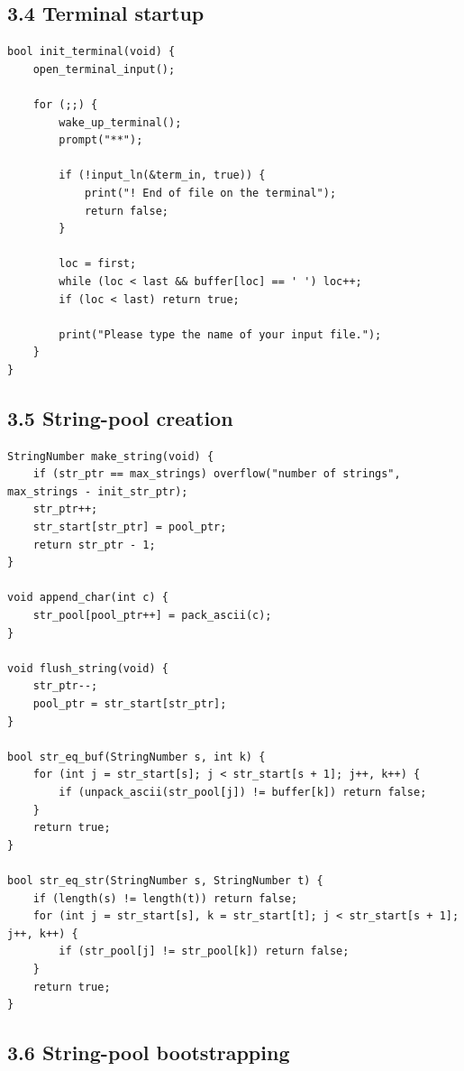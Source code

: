 \documentclass[11pt]{article}
\begin{document}
\subsection{3.4 Terminal startup}\label{terminal-startup}

\begin{verbatim}
bool init_terminal(void) {
    open_terminal_input();

    for (;;) {
        wake_up_terminal();
        prompt("**");

        if (!input_ln(&term_in, true)) {
            print("! End of file on the terminal");
            return false;
        }

        loc = first;
        while (loc < last && buffer[loc] == ' ') loc++;
        if (loc < last) return true;

        print("Please type the name of your input file.");
    }
}
\end{verbatim}

\subsection{3.5 String-pool creation}\label{string-pool-creation}

\begin{verbatim}
StringNumber make_string(void) {
    if (str_ptr == max_strings) overflow("number of strings", max_strings - init_str_ptr);
    str_ptr++;
    str_start[str_ptr] = pool_ptr;
    return str_ptr - 1;
}

void append_char(int c) {
    str_pool[pool_ptr++] = pack_ascii(c);
}

void flush_string(void) {
    str_ptr--;
    pool_ptr = str_start[str_ptr];
}

bool str_eq_buf(StringNumber s, int k) {
    for (int j = str_start[s]; j < str_start[s + 1]; j++, k++) {
        if (unpack_ascii(str_pool[j]) != buffer[k]) return false;
    }
    return true;
}

bool str_eq_str(StringNumber s, StringNumber t) {
    if (length(s) != length(t)) return false;
    for (int j = str_start[s], k = str_start[t]; j < str_start[s + 1]; j++, k++) {
        if (str_pool[j] != str_pool[k]) return false;
    }
    return true;
}
\end{verbatim}

\subsection{3.6 String-pool
bootstrapping}\label{string-pool-bootstrapping}
\end{document}
